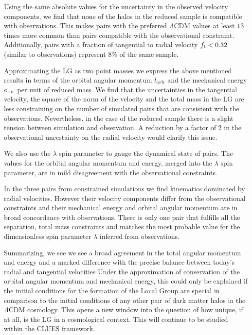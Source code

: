 \documentclass{emulateapj}
\begin{document}
Using the same absolute values for the uncertainty in the observed
velocity components, we find that none of the halos in the reduced sample
is compatible with observations. This makes pairs with the preferred
$\Lambda$CDM values at least $13$ times more common than pairs
compatible with the observational constraint. Additionally, pairs with
a fraction of tangential to radial velocity $f_{\rm t}<0.32$ (similar
to observations) represent $8\%$ of the same sample.  
 

Approximating the LG as two point masses we express the above
mentioned results in terms of the orbital angular momentum $l_{\rm
  orb}$ and the mechanical energy $e_{\rm tot}$ per unit of reduced
mass. We find that the uncertainties in the tangential velocity, the
square of the norm of the velocity and the total mass in the LG
are less constraining on the number of simulated pairs that are
consistent with the observations. Nevertheless, in the case of the
reduced sample there is a slight tension between simulation and
observation. A reduction by a factor of $2$ in the observational
uncertainty on the radial velocity would clarify this issue. 

We also use the $\lambda$ spin parameter to gauge
the dynamical state of pairs. The values for the orbital angular momentum
and energy, merged into the $\lambda$ spin parameter, are in mild
disagreement with the observational constraints. 


In the three pairs from constrained simulations we find kinematics
dominated by radial velocities. However their velocity components
differ from the observational constraints and their mechanical energy
and orbital angular momentum are in broad concordance with
observations. There is only one pair that fulfills all the
separation, total mass constraints and matches the most probable value
for the dimensionless spin parameter $\lambda$ inferred from
observations.  


Summarizing, we see we see a broad agreement in the total angular
momentum and energy and a marked difference with the precise balance
between today's radial and tangential velocities  Under the
approximation of conservation of the orbital angular momentum and
mechanical energy, this could only be explained if the initial
conditions for the formation of the Local Group are special in
comparison to the initial conditions of any other pair of dark matter
halos in the $\Lambda$CDM cosmology. This opens a new window into the
question of how unique, if at all, is the LG in a cosmological
context. This will continue to be studied within the CLUES framework.
\end{document}
